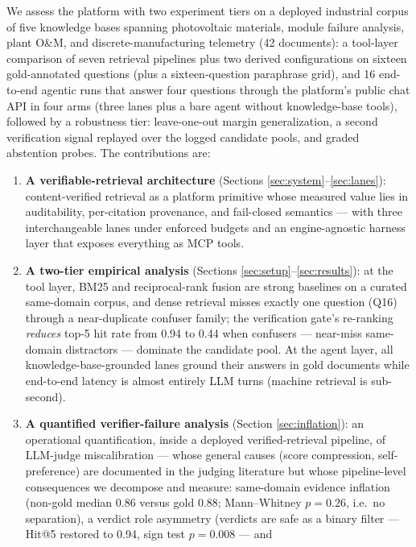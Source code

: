 \documentclass[preprint,12pt]{elsarticle}
\begin{document}
We assess the platform with two experiment tiers on a deployed industrial
corpus of five knowledge bases spanning photovoltaic materials, module
failure analysis, plant O\&M, and discrete-manufacturing telemetry
(42 documents): a tool-layer
comparison of seven retrieval pipelines plus two derived configurations
on sixteen gold-annotated questions (plus a sixteen-question paraphrase
grid), and
16 end-to-end agentic runs that answer four questions through the platform's
public chat API in four arms (three lanes plus a bare agent without
knowledge-base tools), followed by a robustness tier: leave-one-out margin
generalization, a second verification signal replayed over the logged
candidate pools, and graded abstention probes. The contributions are:

\begin{enumerate}
\item \textbf{A verifiable-retrieval architecture} (Sections
\ref{sec:system}--\ref{sec:lanes}): content-verified retrieval as a
platform primitive whose measured value lies in auditability, per-citation
provenance, and fail-closed semantics --- with three interchangeable lanes
under enforced budgets and an engine-agnostic harness layer that exposes
everything as MCP tools.
\item \textbf{A two-tier empirical analysis} (Sections
\ref{sec:setup}--\ref{sec:results}): at the tool layer, BM25 and reciprocal-rank
fusion are strong baselines on a curated same-domain corpus, and dense
retrieval misses exactly one question (Q16) through a near-duplicate
confuser family; the
verification gate's re-ranking \emph{reduces} top-5 hit rate from 0.94 to
0.44 when confusers
--- near-miss same-domain distractors --- dominate the candidate pool. At
the agent layer, all knowledge-base-grounded lanes ground their answers in
gold documents while end-to-end latency is almost entirely LLM turns
(machine retrieval is sub-second).
\item \textbf{A quantified verifier-failure analysis} (Section
\ref{sec:inflation}): an operational quantification, inside a deployed
verified-retrieval pipeline, of LLM-judge miscalibration --- whose
general causes (score compression, self-preference) are documented in the
judging literature \cite{zheng-llmjudge,panickssery-selfpref} but whose
pipeline-level consequences we decompose and measure: same-domain evidence
inflation (non-gold median 0.86 versus gold 0.88; Mann--Whitney $p = 0.26$,
i.e.\ no separation), a verdict role asymmetry (verdicts are safe as a
binary filter --- Hit@5 restored to 0.94, sign test $p = 0.008$ --- and

\end{enumerate}
\end{document}
